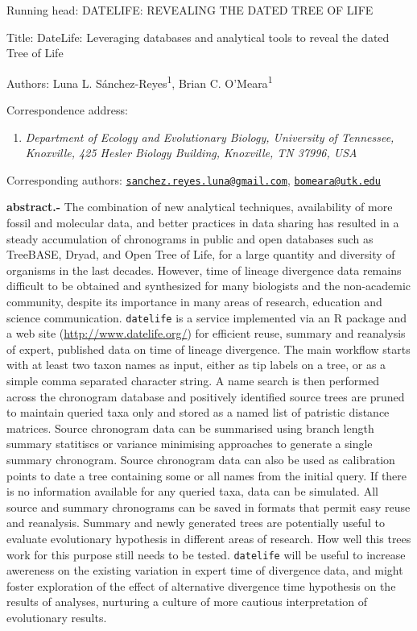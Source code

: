 \documentclass[]{article}
\title{}
\author{}
\date{}
\providecommand{\tightlist}{%
  \setlength{\itemsep}{0pt}\setlength{\parskip}{0pt}}
\begin{document}
Running head: DATELIFE: REVEALING THE DATED TREE OF LIFE

Title: DateLife: Leveraging databases and analytical tools to reveal the dated Tree of Life

Authors: Luna L. Sánchez-Reyes\textsuperscript{1}, Brian C. O'Meara\textsuperscript{1}

Correspondence address:

\begin{enumerate}
\def\labelenumi{\arabic{enumi}.}
\tightlist
\item
  \emph{Department of Ecology and Evolutionary Biology, University of Tennessee, Knoxville, 425 Hesler Biology Building, Knoxville, TN 37996, USA}
\end{enumerate}

Corresponding authors: \href{mailto:sanchez.reyes.luna@gmail.com}{\nolinkurl{sanchez.reyes.luna@gmail.com}}, \href{mailto:bomeara@utk.edu}{\nolinkurl{bomeara@utk.edu}}

\newpage

\textbf{abstract.-}
The combination of new analytical techniques, availability of more fossil and molecular
data, and better practices in data sharing has resulted in a steady accumulation
of chronograms in public and open databases such as TreeBASE, Dryad, and Open Tree
of Life, for a large quantity and diversity of organisms in the last decades. However, time of lineage divergence data remains difficult to be obtained and synthesized for many biologists and the non-academic community, despite its importance in many areas of research, education and science communication. \texttt{datelife} is a service implemented via an R package and a web site
(\url{http://www.datelife.org/}) for efficient reuse, summary and reanalysis of expert, published data on time of lineage divergence. The main workflow starts with at least two taxon names as input, either as tip labels on a tree, or as a simple comma separated character string. A name search is then performed across the chronogram database and positively identified source trees are pruned to maintain queried taxa only and stored as a named list of patristic distance matrices. Source chronogram data can be summarised using branch length summary statitiscs or variance minimising approaches to generate a single summary chronogram. Source chronogram data can also be used as calibration points to date a tree containing some or all names from the initial query. If there is no information available for any queried taxa, data can be simulated. All source and summary chronograms can be saved in formats that permit easy reuse and reanalysis. Summary and newly generated trees are potentially useful to evaluate evolutionary hypothesis in different areas of research. How well this trees work for this purpose still needs to be tested. \texttt{datelife} will be useful to increase awereness on the existing variation in expert time of divergence data, and might foster exploration of the effect of alternative divergence time hypothesis on the results of analyses, nurturing a culture of more cautious interpretation of evolutionary results.
\end{document}
